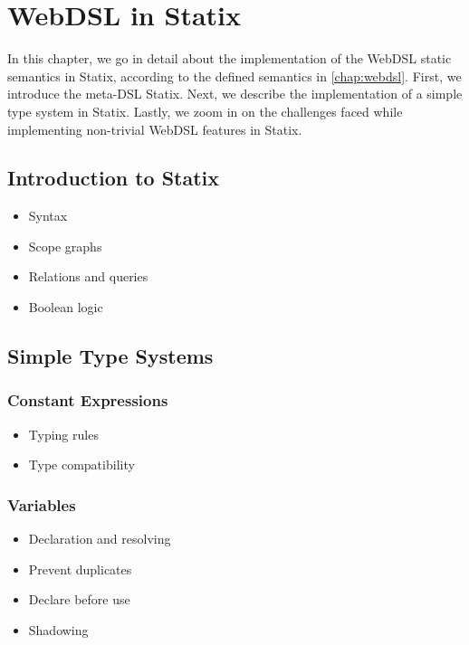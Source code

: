 
\chapter{\label{chap:statix}WebDSL in Statix}

  In this chapter, we go in detail about the implementation of the WebDSL static semantics in Statix, according to the defined semantics in \cref{chap:webdsl}. First, we introduce the meta-DSL Statix. Next, we describe the implementation of a simple type system in Statix. Lastly, we zoom in on the challenges faced while implementing non-trivial WebDSL features in Statix.

  \section{\label{sec:statix}Introduction to Statix}

    \begin{itemize}
      \item Syntax
      \item Scope graphs
      \item Relations and queries
      \item Boolean logic
    \end{itemize}
  
  \section{\label{sec:simple-type-systems}Simple Type Systems}

    \subsection{\label{subsec:simple-constants}Constant Expressions}

      \begin{itemize}
        \item Typing rules
        \item Type compatibility
      \end{itemize}

    \subsection{\label{subsec:simple-variables}Variables}

      \begin{itemize}
        \item Declaration and resolving
        \item Prevent duplicates
        \item Declare before use
        \item Shadowing
      \end{itemize}

